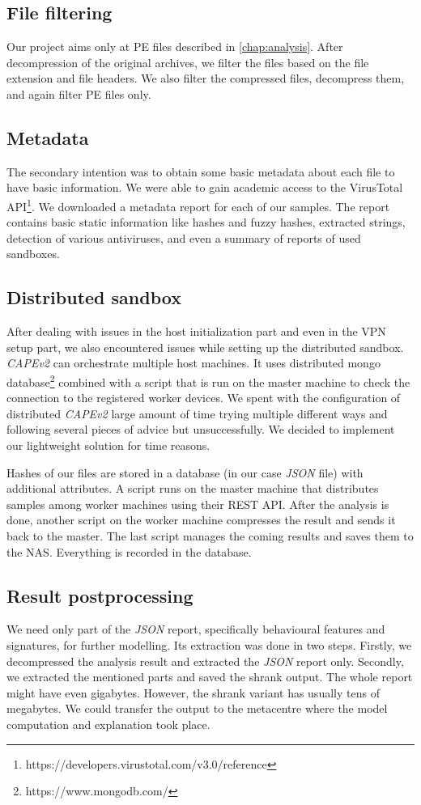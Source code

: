 \subsection{File filtering}
Our project aims only at PE files described in \ref{chap:analysis}. After decompression of the original archives, we filter the files based on the file extension and file headers. We also filter the compressed files, decompress them, and again filter PE files only.

\subsection{Metadata}
The secondary intention was to obtain some basic metadata about each file to have basic information. We were able to gain academic access to the VirusTotal API\footnote{https://developers.virustotal.com/v3.0/reference}. We downloaded a metadata report for each of our samples. The report contains basic static information like hashes and fuzzy hashes, extracted strings, detection of various antiviruses, and even a summary of reports of used sandboxes.

\subsection{Distributed sandbox}
After dealing with issues in the host initialization part and even in the VPN setup part, we also encountered issues while setting up the distributed sandbox. \emph{CAPEv2} can orchestrate multiple host machines. It uses distributed mongo database\footnote{https://www.mongodb.com/} combined with a script that is run on the master machine to check the connection to the registered worker devices. We spent with the configuration of distributed \emph{CAPEv2} large amount of time trying multiple different ways and following several pieces of advice but unsuccessfully. We decided to implement our lightweight solution for time reasons.

Hashes of our files are stored in a database (in our case \emph{JSON} file) with additional attributes. A script runs on the master machine that distributes samples among worker machines using their REST API. After the analysis is done, another script on the worker machine compresses the result and sends it back to the master. The last script manages the coming results and saves them to the NAS. Everything is recorded in the database.

\subsection{Result postprocessing}
We need only part of the \emph{JSON} report, specifically behavioural features and signatures, for further modelling. Its extraction was done in two steps. Firstly, we decompressed the analysis result and extracted the \emph{JSON} report only. Secondly, we extracted the mentioned parts and saved the shrank output. The whole report might have even gigabytes. However, the shrank variant has usually tens of megabytes. We could transfer the output to the metacentre where the model computation and explanation took place.

